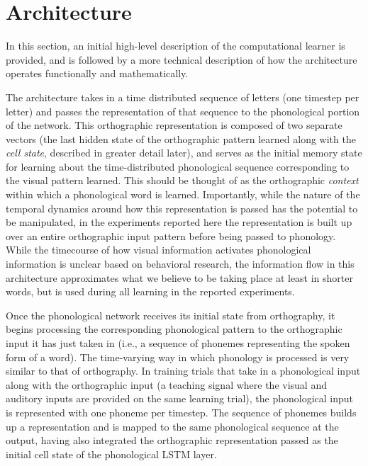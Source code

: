 \documentclass[
  american,
  ,man,floatsintext]{apa6}
\begin{document}
\hypertarget{architecture}{%
\section{Architecture}\label{architecture}}

In this section, an initial high-level description of the computational learner is provided, and is followed by a more technical description of how the architecture operates functionally and mathematically.

The architecture takes in a time distributed sequence of letters (one timestep per letter) and passes the representation of that sequence to the phonological portion of the network. This orthographic representation is composed of two separate vectors (the last hidden state of the orthographic pattern learned along with the \emph{cell state}, described in greater detail later), and serves as the initial memory state for learning about the time-distributed phonological sequence corresponding to the visual pattern learned. This should be thought of as the orthographic \emph{context} within which a phonological word is learned. Importantly, while the nature of the temporal dynamics around how this representation is passed has the potential to be manipulated, in the experiments reported here the representation is built up over an entire orthographic input pattern before being passed to phonology. While the timecourse of how visual information activates phonological information is unclear based on behavioral research, the information flow in this architecture approximates what we believe to be taking place at least in shorter words, but is used during all learning in the reported experiments.

Once the phonological network receives its initial state from orthography, it begins processing the corresponding phonological pattern to the orthographic input it has just taken in (i.e., a sequence of phonemes representing the spoken form of a word). The time-varying way in which phonology is processed is very similar to that of orthography. In training trials that take in a phonological input along with the orthographic input (a teaching signal where the visual and auditory inputs are provided on the same learning trial), the phonological input is represented with one phoneme per timestep. The sequence of phonemes builds up a representation and is mapped to the same phonological sequence at the output, having also integrated the orthographic representation passed as the initial cell state of the phonological LSTM layer.
\end{document}
